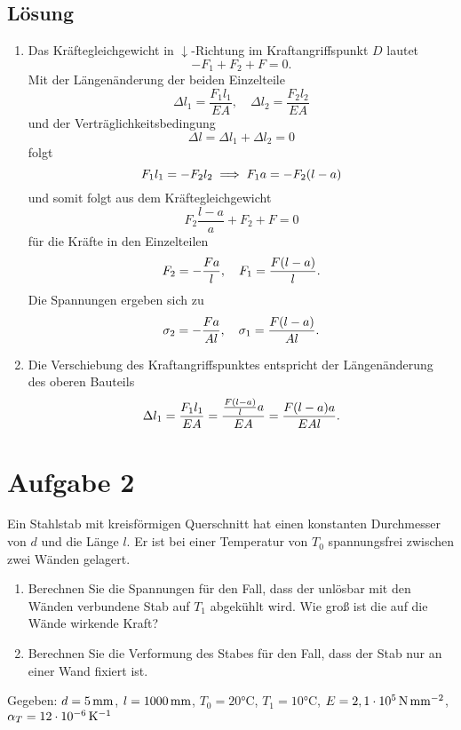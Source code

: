 \documentclass{exercise}
\begin{document}
    \subsection*{Lösung}
    \begin{enumerate}
        \item Das Kräftegleichgewicht in \(\downarrow\)-Richtung im Kraftangriffspunkt \(D\) lautet
        \[
            -F_1 + F_2 + F = 0.
        \]
        Mit der Längenänderung der beiden Einzelteile
        \[
            \Delta l_1 = \frac{F_1 l_1}{EA}, \quad \Delta l_2 = \frac{F_2 l_2}{EA}
        \]
        und der Verträglichkeitsbedingung
        \[
            \Delta l = \Delta l_1 + \Delta l_2 = 0
        \]
        folgt
        \[
            F_1 l_1 = -F_2 l_2 \implies F_1 a = -F_2\parentheses*{l - a}
        \]
        und somit folgt aus dem Kräftegleichgewicht
        \[
            F_2\frac{l - a}{a} + F_2 + F = 0
        \]
        für die Kräfte in den Einzelteilen
        \[
            F_2 = -\frac{Fa}{l}, \quad F_1 = \frac{F\parentheses*{l - a}}{l}.
        \]
        Die Spannungen ergeben sich zu
        \[
            \sigma_2 = -\frac{Fa}{Al}, \quad \sigma_1 = \frac{F\parentheses*{l - a}}{Al}.
        \]
        \item Die Verschiebung des Kraftangriffspunktes entspricht der Längenänderung des oberen Bauteils
        \[
            \Delta l_1 = \frac{F_1 l_1}{EA} = \frac{\frac{F\parentheses*{l - a}}{l}a}{EA} = \frac{F\parentheses*{l - a}a}{EAl}.
        \]
    \end{enumerate}


    \section*{Aufgabe 2}

    \begin{problem}
        Ein Stahlstab mit kreisförmigen Querschnitt hat einen konstanten Durchmesser von \(d\) und die Länge \(l\).
        Er ist bei einer Temperatur von \(T_0\) spannungsfrei zwischen zwei Wänden gelagert.
        \begin{enumerate}
            \item Berechnen Sie die Spannungen für den Fall, dass der unlösbar mit den Wänden verbundene Stab auf \(T_1\) abgekühlt wird.
            Wie groß ist die auf die Wände wirkende Kraft?
            \item Berechnen Sie die Verformung des Stabes für den Fall, dass der Stab nur an einer Wand fixiert ist.
        \end{enumerate}
        Gegeben: \(d = 5\,\si{\milli\meter}\), \(l = 1000\,\si{\milli\meter}\), \(T_0 = 20\si{\degreeCelsius}\), \(T_1 = 10\si{\degreeCelsius}\), \(E = 2,1 \cdot 10^5\,\si{\newton\per\milli\meter\squared}\), \(\alpha_T = 12 \cdot 10^{-6}\,\si{\per\kelvin}\)
    \end{problem}
\end{document}
